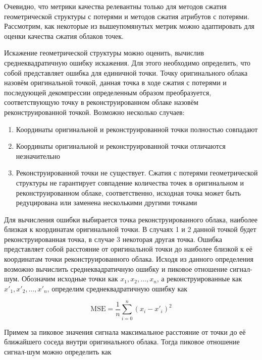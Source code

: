Очевидно, что метрики качества релевантны только для методов сжатия
геометрической структуры с потерями и методов сжатия атрибутов с потерями.
Рассмотрим, как некоторые из вышеупомянутых метрик можно адаптировать для оценки
качества сжатия облаков точек.


Искажение геометрической структуры можно оценить, вычислив среднеквадратичную
ошибку искажения. Для этого необходимо определить, что собой представляет ошибка
для единичной точки. Точку оригинального облака назовём оригинальной точкой,
данная точка в ходе сжатия с потерями и последующей декомпрессии определенным
образом преобразуется, соответствующую точку в реконструированном облаке назовём
реконструированной точкой. Возможно несколько случаев:

\begin{enumerate}
    \item Координаты оригинальной и реконструированной точки полностью совпадают
    \item Координаты оригинальной и реконструированной точки отличаются
    незначительно
    \item Реконструированной точки не существует. Сжатия с потерями
    геометрической структуры не гарантирует совпадение количества точек в
    оригинальном и реконструированном облаке, соответственно, исходная точка
    может быть редуцирована или заменена несколькими другими точками
\end{enumerate}

Для вычисления ошибки выбирается точка реконструированного облака, наиболее
близкая к координатам оригинальной точки. В случаях 1 и 2 данной точкой будет
реконструированная точка, в случае 3 некоторая другая точка. Ошибка представляет
собой расстояние от оригинальной точки до наиболее близкой к её координатам
точки реконструированного облака. Исходя из данного определения возможно
вычислить среднеквадратичную ошибку и пиковое отношение сигнал-шум. Обозначим
исходные точки как $x_{1}, x_{2}, \dots, x_{n}$, а реконструированные как
$x'_{1}, x'_{2}, \dots, x'_{n}$, определим среднеквадратичную ошибку как

\begin{equation} \label{eq:cloud_mse}
    \text{MSE} = \frac{1}{n} \sum_{i = 0}^{n} \left( x_{i} - x'_{i} \right)^{2}
\end{equation}

Примем за пиковое значения сигнала максимальное расстояние от точки до её
ближайшего соседа внутри оригинального облака. Тогда пиковое отношение
сигнал-шум можно определить как

